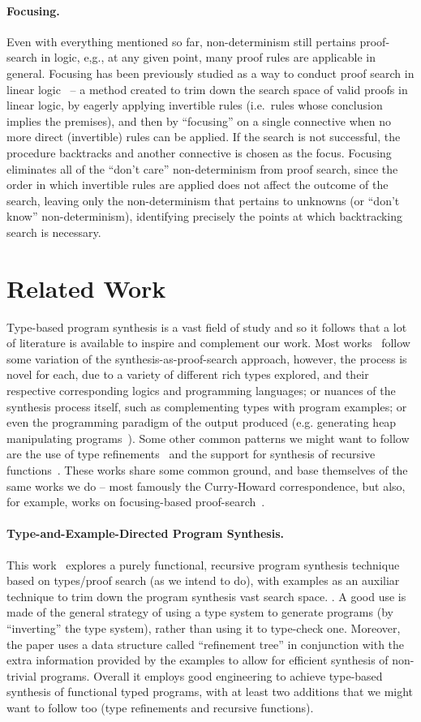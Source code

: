 \documentclass{llncs}
\newcommand{\mypara}[1]{\paragraph{\textbf{#1}.}}
\begin{document}
\mypara{Focusing}
Even with everything mentioned so far, non-determinism still pertains proof-search in logic, e,g., at any given point, many proof rules are applicable in general.
Focusing has been previously studied as a way to conduct proof search in linear logic~\cite{}
--
a method created to trim down the search space of valid proofs in
linear logic, by eagerly applying invertible rules (i.e.~rules whose
conclusion implies the premises), and then by ``focusing'' on a single
connective when no more direct (invertible) rules can be applied. If
the search is not successful, the procedure backtracks and another
connective is chosen as the focus.
%
Focusing eliminates all of the
``don't care'' non-determinism from proof search, since the order in
which invertible rules are applied does not affect the outcome of the
search, leaving only the non-determinism that pertains to unknowns (or
``don't know'' non-determinism), identifying precisely the points at
which backtracking search is necessary.


\section{Related Work}

Type-based program synthesis is a vast field of study and so it
follows that a lot of literature is available to inspire and
complement our work. Most works~\cite{} follow some variation of the
synthesis-as-proof-search approach, however, the process is novel for
each, due to a variety of different rich types explored, and their
respective corresponding logics and programming languages; or nuances
of the synthesis process itself, such as complementing types with
program examples; or even the programming paradigm of the output
produced (e.g. generating heap manipulating
programs~\cite{DBLP:journals/pacmpl/PolikarpovaS19}).  Some other
common patterns we might want to follow are the use of type
refinements~\cite{} and the support for synthesis of recursive
functions~\cite{}.  These works share some common ground, and base
themselves of the same works we do -- most famously the Curry-Howard
correspondence, but also, for example, works on focusing-based
proof-search~\cite{focusing}.

\mypara{Type-and-Example-Directed Program Synthesis} This
work~\cite{DBLP:conf/pldi/OseraZ15,DBLP:conf/popl/FrankleOWZ16}
explores a purely functional, recursive program synthesis technique
based on types/proof search (as we intend to do), with examples as an
auxiliar technique to trim down the program synthesis vast search
space.  .  A good use is
made of the general strategy of using a type system to generate
programs (by ``inverting'' the type system), rather than using it to
type-check one.  Moreover, the paper uses a data structure called
``refinement tree'' in conjunction with the extra information provided
by the examples to allow for efficient synthesis of non-trivial
programs. Overall it employs good engineering to achieve type-based
synthesis of functional typed programs, with at least two additions
that we might want to follow too (type refinements and recursive
functions).
\end{document}
